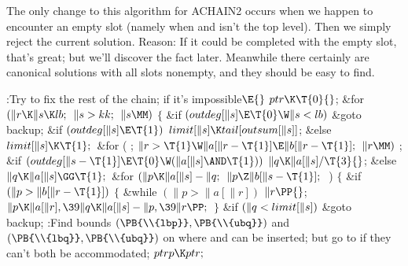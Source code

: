 The only change to this algorithm for {\mc ACHAIN2} occurs when we happen
to encounter an empty slot (namely when  and 
isn't the top level). Then we simply reject the current solution.
Reason: If it could be completed with the empty slot, that's great; but
we'll discover the fact later. Meanwhile there certainly are canonical
solutions with all slots nonempty, and they should be easy to find.

\Y\B\4:Try to fix the rest of the chain;  if it's
impossible\X${}\E{}$\6
$\\{ptr}\K\T{0}{}$;\6
\&{for} ${}(\|r\K\|s\K\\{lb};{}$ ${}\|s>\\{kk};{}$ ${}\|s\MM){}$\5
${}\{{}$\1\6
\&{if} ${}(\\{outdeg}[\|s]\E\T{0}\W\|s<\\{lb}){}$\1\5
\&{goto} \\{backup};\2\6
\&{if} ${}(\\{outdeg}[\|s]\E\T{1}){}$\1\5
${}\\{limit}[\|s]\K\\{tail}[\\{outsum}[\|s]]{}$;\5
\2\&{else}\1\5
${}\\{limit}[\|s]\K\T{1};{}$\2\6
\&{for} ( ; ${}\|r>\T{1}\W\|a[\|r-\T{1}]\E\|b[\|r-\T{1}];{}$ ${}\|r\MM){}$\1\5
;\2\6
\&{if} ${}(\\{outdeg}[\|s-\T{1}]\E\T{0}\W(\|a[\|s]\AND\T{1})){}$\1\5
${}\|q\K\|a[\|s]/\T{3}{}$;\5
\2\&{else}\1\5
${}\|q\K\|a[\|s]\GG\T{1};{}$\2\6
\&{for} ${}(\|p\K\|a[\|s]-\|q;{}$ ${}\|p\Z\|b[\|s-\T{1}];{}$ \,)\5
${}\{{}$\1\6
\&{if} ${}(\|p>\|b[\|r-\T{1}]){}$\5
${}\{{}$\1\6
\&{while} ${}(\|p>\|a[\|r]){}$\1\5
${}\|r\PP{}$;\2\6
${}\|p\K\|a[\|r],\39\|q\K\|a[\|s]-\|p,\39\|r\PP;{}$\6
\4${}\}{}$\2\6
\&{if} ${}(\|q<\\{limit}[\|s]){}$\1\5
\&{goto} \\{backup};\2\6
:Find bounds $(\PB{\\{lbp}},\PB{\\{ubq}})$ and $(\PB{\\{lbq}},\PB{%
\\{ubq}})$ on where  and  can be inserted; but go to  if they can't both be accommodated\X;\6
${}\\{ptrp}\K\\{ptr};{}$\6
